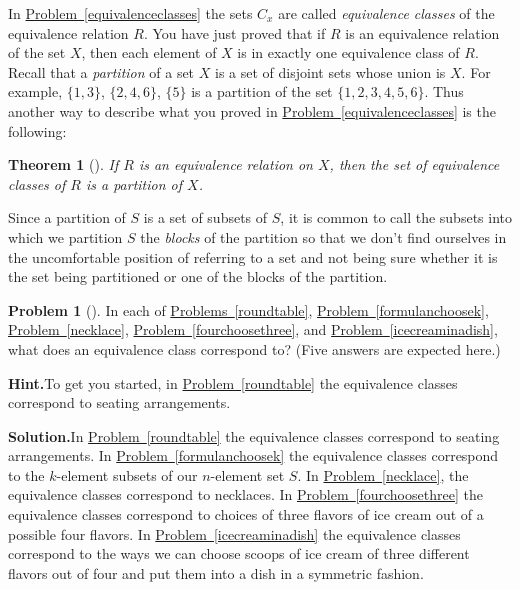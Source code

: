 \documentclass[10pt,]{book}
\theoremstyle{plain}
\newtheorem{theorem}{Theorem}[section]
\theoremstyle{definition}
\newtheorem{activity}[project]{Problem}
\theoremstyle{definition}
\numberwithin{equation}{chapter}
\begin{document}
In \hyperref[equivalenceclasses]{Problem~\ref{equivalenceclasses}} the sets \(C_x\) are called \emph{equivalence classes} of the equivalence relation \(R\). You have just proved that if \(R\) is an equivalence relation of the set \(X\), then each element of \(X\) is in exactly one equivalence class of \(R\). Recall that a \emph{partition} of a set \(X\) is a set of disjoint sets whose union is \(X\). For example, \(\{1,3\}\), \(\{2,4,6\}\), \(\{5\}\) is a partition of the set \(\{1,2,3,4,5,6\}\). Thus another way to describe what you proved in \hyperref[equivalenceclasses]{Problem~\ref{equivalenceclasses}} is the following:%
\begin{theorem}[{}]\label{theorem-10}
If \(R\) is an equivalence relation on \(X\), then the set of equivalence classes of \(R\) is a partition of \(X\).%
\end{theorem}
Since a partition of \(S\) is a set of subsets of \(S\), it is common to call the subsets into which we partition \(S\) the \emph{blocks} of the partition so that we don't find ourselves in the uncomfortable position of referring to a set and not being sure whether it is the set being partitioned or one of the blocks of the partition.%
\begin{activity}[]\label{partitiontoequivalence}
In each of \hyperref[roundtable]{Problems~\ref{roundtable}}, \hyperref[formulanchoosek]{Problem~\ref{formulanchoosek}}, \hyperref[necklace]{Problem~\ref{necklace}}, \hyperref[fourchoosethree]{Problem~\ref{fourchoosethree}}, and \hyperref[icecreaminadish]{Problem~\ref{icecreaminadish}}, what does an equivalence class correspond to? (Five answers are expected here.)%
\par\medskip\noindent%
\textbf{Hint.}\quad To get you started, in \hyperref[roundtable]{Problem~\ref{roundtable}} the equivalence classes correspond to seating arrangements.%
\par\medskip\noindent%
\textbf{Solution.}\quad In \hyperref[roundtable]{Problem~\ref{roundtable}} the equivalence classes correspond to seating arrangements. In \hyperref[formulanchoosek]{Problem~\ref{formulanchoosek}} the equivalence classes correspond to the \(k\)-element subsets of our \(n\)-element set \(S\). In \hyperref[necklace]{Problem~\ref{necklace}}, the equivalence classes correspond to necklaces. In \hyperref[fourchoosethree]{Problem~\ref{fourchoosethree}} the equivalence classes correspond to choices of three flavors of ice cream out of a possible four flavors. In \hyperref[icecreaminadish]{Problem~\ref{icecreaminadish}} the equivalence classes correspond to the ways we can choose scoops of ice cream of three different flavors out of four and put them into a dish in a symmetric fashion.%
\end{activity}
\end{document}
